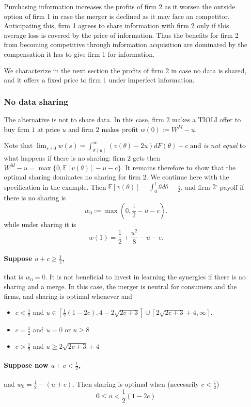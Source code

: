 \documentclass[a4paper,leqno]{article}%
\newcommand{\E}{\mathbb E}
\renewcommand{\t}{\theta}
\newcommand{\s}{\sigma}
\begin{document}
Purchasing information increases the profits of firm 2 as it worsen the outside option of firm 1 in case the merger is declined as it may face an competitor. Anticipating this, firm 1 agrees to share information with firm 2 only if this average loss is covered by the price of information. Thus the benefits for firm 2 from becoming competitive through information acquisition are dominated by the compensation it has to give firm 1 for information. 

\medskip

We characterize in the next section the profits of firm 2 in case no data is shared, and it offers a fixed price to firm 1 under imperfect information. 



\subsubsection{No data sharing}

The alternative is not to share data. In this case, firm $2$ makes a TIOLI offer to buy firm $1$ at price $u$ and firm $2$ makes profit $w(0):=W^M-u$.


Note that $\lim_{s\downarrow 0}w(s)=\int_{\s(u)}^\infty (v(\t)-2u)dF(\t)-c$ and \emph{is not equal } to what happens if there is no sharing: firm $2$ gets then $W^M-u=\max\{0, \E[v(\t)]-u-c\}$. It remains therefore to show that the optimal sharing dominates no sharing for firm $2$. We continue here with the specification in the example. Then $\E[v(\t)]=\int_0^1 \t d\t=\frac{1}{2}$, and firm $2$' payoff if there is no sharing is 
%
\[
w_0:=\max(0,\frac{1}{2}-u-c).
\]
%
while under sharing it is 
%
\[
w(1) = \frac{1}{2}+\frac{u^2}{8}-u-c. 
\]
%

\paragraph{Suppose $u+c\geq \frac{1}{2}$,} that is $w_0=0$. It is not beneficial to invest in learning the synergies if there is no sharing and a merge. In this case, the merger is neutral for consumers and the firms, and sharing is optimal whenever  and 
%
\begin{itemize}
    \item $c<\frac{1}{2}$ and $u\in \left[\frac{1}{2} (1-2 c),4-2 \sqrt{2 c+3}\right]\cup [2 \sqrt{2c+3}+4,\infty]$.
    \item $c=\frac{1}{2}$ and $u=0$ or $u\geq 8 $
    \item $c>\frac{1}{2}$ and $u\geq 2\sqrt{2 c+3}+4$
\end{itemize}
%


\paragraph{Suppose now $u+c<\frac{1}{2}$,} and $w_0=\frac{1}{2}-(u+c)$. Then sharing is optimal when (necesarily $c<\frac{1}{2}$)
%
\[
0\leq u<\frac{1}{2} (1-2 c)
\]




\end{document}
